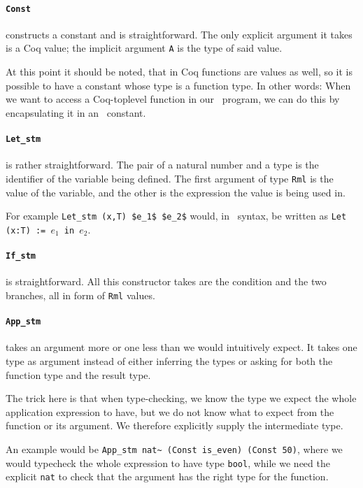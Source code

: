 \documentclass[11pt, leqno, titlepage]{article}
\def\coqe{\lstinline[language=Coq, basicstyle=\small]}
\theoremstyle{definition}
\begin{document}
\paragraph{\coqe{Const}} constructs a constant and is straightforward. The only explicit
argument it takes is a Coq value; the implicit argument \texttt{A} is the type of
said value.

At this point it should be noted, that in Coq functions are values as well, so it is
possible to have a constant whose type is a function type. In other words: When we
want to access a Coq-toplevel function in our \rmlx\ program, we can do this by
encapsulating it in an \rmlx\ constant. 

\paragraph{\coqe{Let_stm}} is rather straightforward. The pair of a natural number and a
type is the identifier of the variable being defined. The first argument of type
\coqe{Rml} is the value of the variable, and the other is the expression the value is
being used in.

For example \coqe{Let_stm (x,T) $e_1$ $e_2$} would, in \rml\ syntax, be written as
\texttt{Let (x:T) := $e_1$ in $e_2$}. 

\paragraph{\coqe{If_stm}} is straightforward. All this constructor takes are the condition
and the two branches, all in form of \coqe{Rml} values.

\paragraph{\coqe{App_stm}} takes an argument more or one less than we would
intuitively expect. It takes one type as argument instead of either inferring the
types or asking for both the function type and the result type.

The trick here is that when type-checking, we know the type we expect the whole application
expression to have, but we do not know what to expect from the function or its
argument. We therefore explicitly supply the intermediate type. 

An example would be \coqe{App_stm nat~ (Const is_even) (Const 50)}, where we would
typecheck the whole expression to have type \coqe{bool}, while we need the explicit
\coqe{nat} to check that the argument has the right type
for the function.
\end{document}
